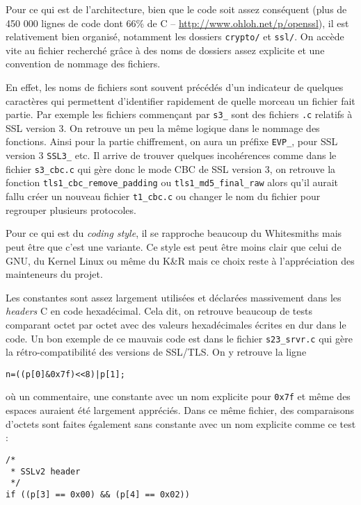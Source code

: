 Pour ce qui est de l'architecture, bien que le code soit assez conséquent (plus de 450 000 lignes de code dont 66\% de C -- \url{http://www.ohloh.net/p/openssl}), il est relativement bien organisé, notamment les dossiers \verb+crypto/+ et \verb+ssl/+. On accède vite au fichier recherché grâce à des noms de dossiers assez explicite et une convention de nommage des fichiers.

En effet, les noms de fichiers sont souvent précédés d'un indicateur de quelques caractères qui permettent d'identifier rapidement de quelle morceau un fichier fait partie. Par exemple les fichiers commençant par \verb+s3_+ sont des fichiers \verb+.c+ relatifs à SSL version 3. On retrouve un peu la même logique dans le nommage des fonctions. Ainsi pour la partie chiffrement, on aura un préfixe \verb+EVP_+, pour SSL version 3 \verb+SSL3_+ etc. Il arrive de trouver quelques incohérences comme dans le fichier \verb+s3_cbc.c+ qui gère donc le mode CBC de SSL version 3, on retrouve la fonction \verb+tls1_cbc_remove_padding+ ou \verb+tls1_md5_final_raw+ alors qu'il aurait fallu créer un nouveau fichier \verb+t1_cbc.c+ ou changer le nom du fichier pour regrouper plusieurs protocoles.

Pour ce qui est du \textit{coding style}, il se rapproche beaucoup du Whitesmiths mais peut être que c'est une variante. Ce style est peut être moins clair que celui de GNU, du Kernel Linux ou même du K\&R mais ce choix reste à l'appréciation des mainteneurs du projet.

Les constantes sont assez largement utilisées et déclarées massivement dans les \textit{headers} C en code hexadécimal. Cela dit, on retrouve beaucoup de tests comparant octet par octet avec des valeurs hexadécimales écrites en dur dans le code. Un bon exemple de ce mauvais code est dans le fichier \verb+s23_srvr.c+ qui gère la rétro-compatibilité des versions de SSL/TLS. On y retrouve la ligne 
\begin{lstlisting}[style=customc,label=badcode, caption=Exemple de mauvais code d'OpenSSL]
n=((p[0]&0x7f)<<8)|p[1];
\end{lstlisting}

où un commentaire, une constante avec un nom explicite pour \verb+0x7f+ et même des espaces auraient été largement appréciés. Dans ce même fichier, des comparaisons d'octets sont faites également sans constante avec un nom explicite comme ce test :

\begin{lstlisting}[style=customc,label=badcodetest, caption=Exemple de mauvais test d'OpenSSL]
/*
 * SSLv2 header
 */
if ((p[3] == 0x00) && (p[4] == 0x02))
\end{lstlisting}

